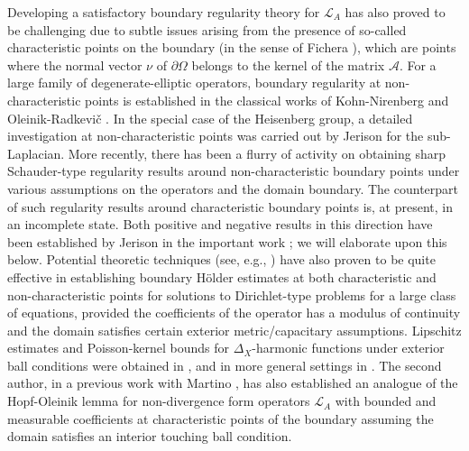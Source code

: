 \documentclass[12pt]{amsart}
\def \L {\mathcal{L}}
\def \O {\Omega}
\begin{document}
Developing a satisfactory boundary regularity theory for $\L_A$ has also proved to be challenging due to subtle issues arising from the presence of so-called characteristic points on the boundary (in the sense of Fichera \cite{Fichera}), which are points where the normal vector $\nu$ of $\partial \O$ belongs to the kernel of the matrix $\mathcal{A}$. For a large family of degenerate-elliptic operators, boundary regularity at non-characteristic points is established in the classical works of Kohn-Nirenberg \cite{KohnNirenberg65} and Oleinik-Radkevi\v{c} \cite{OR}. In the special case of the Heisenberg group, a detailed investigation at non-characteristic points was carried out by Jerison \cite{Jerison81-1} for the sub-Laplacian. More recently, there has been a flurry of activity  \cite{BaldiCittiCupini2019, BanerjeeGarofaloMunive2019, BanerjeeGarofaloMunive-Annalen2024, Citti-Giovannardi-Sire} on obtaining sharp Schauder-type regularity results around non-characteristic boundary points under various assumptions on the operators and the domain boundary. The counterpart of such regularity results around characteristic boundary points is, at present, in an incomplete state. Both positive and negative results in this direction have been established by Jerison in the important work \cite{Jerison81-2}; we will elaborate upon this below. Potential theoretic techniques (see, e.g., \cite{Bony, BLU2007, LU2010}) have also proven to be quite effective in establishing boundary H\"older estimates at both characteristic and non-characteristic points for solutions to Dirichlet-type problems for a large class of equations, provided the coefficients of the operator has a modulus of continuity and the domain satisfies certain exterior metric/capacitary assumptions. Lipschitz estimates and Poisson-kernel bounds for $\Delta_X$-harmonic functions under exterior ball conditions were obtained in \cite{Lanconelli-Uguzzoni-PoissonKernel}, and in more general settings in \cite{CapognaGarofaloNhieu02}. The second author, in a previous work with Martino \cite{MartinoTralli2016}, has also established an analogue of the Hopf-Oleinik lemma for non-divergence form operators $\L_A$ with bounded and measurable coefficients at characteristic points of the boundary assuming the domain satisfies an interior touching ball condition.
 
\end{document}
